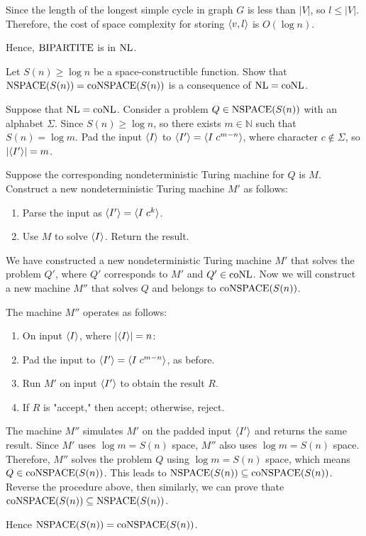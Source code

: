 \documentclass{homework}
\begin{document}
\begin{solution}
  Since the length of the longest simple cycle in graph $G$ is less than $|V|$,
  so $l \le |V|$.
  Therefore, the cost of space complexity for storing $\langle v, l\rangle$ is $O(\log n)$.

  Hence, $\mathrm{BIPARTITE}$ is in $\textup{NL}$.

\end{solution}

\begin{problem}
  Let $S(n) \ge \log n$ be a space-constructible function.
  Show that $\textup{NSPACE}(S(n)) = \textup{coNSPACE}(S(n))$ is a consequence of
  $\textup{NL} = \textup{coNL}$.
\end{problem}

\begin{solution}

  Suppose that $\textup{NL} = \textup{coNL}$. Consider a problem $Q \in \textup{NSPACE}(S(n))$
  with an alphabet $\Sigma$.
  Since $S(n) \ge \log n$, so there exists $m \in \mathbb{N}$
  such that $S(n) = \log m$.
  Pad the input $\langle I\rangle$ to $\langle I'\rangle = \langle I\;c^{m - n}\rangle$,
  where character $c \notin \Sigma$, so $|\langle I'\rangle| = m$.

  Suppose the corresponding nondeterministic Turing machine for $Q$ is $M$.
  Construct a new nondeterministic Turing machine $M'$ as follows:

  \begin{enumerate}
    \item Parse the input as $\langle I'\rangle = \langle I\;c^k\rangle$.
    \item Use $M$ to solve $\langle I\rangle$. Return the result.
  \end{enumerate}

  We have constructed a new nondeterministic Turing machine $M'$ that
  solves the problem $Q'$, where $Q'$ corresponds to $M'$ and $Q' \in \textup{coNL}$.
  Now we will construct a new machine $M''$ that
  solves $Q$ and belongs to $\textup{coNSPACE}(S(n))$.

  The machine $M''$ operates as follows:

  \begin{enumerate}
    \item On input $\langle I\rangle$, where $|\langle I\rangle| = n$:
    \item Pad the input to $\langle I'\rangle = \langle I\;c^{m-n}\rangle$, as before.
    \item Run $M'$ on input $\langle I'\rangle$ to obtain the result $R$.
    \item If $R$ is "accept," then accept; otherwise, reject.
  \end{enumerate}

  The machine $M''$ simulates $M'$ on the padded input $\langle I'\rangle$
  and returns the same result. Since $M'$ uses $\log m = S(n)$ space,
  $M''$ also uses $\log m = S(n)$ space.
  Therefore, $M''$ solves the problem $Q$ using $\log m = S(n)$ space,
  which means $Q \in \textup{coNSPACE}(S(n))$. This leads to
  $\textup{NSPACE}(S(n)) \subseteq \textup{coNSPACE}(S(n))$. Reverse the
  procedure above, then similarly, we can prove thate
  $\textup{coNSPACE}(S(n)) \subseteq \textup{NSPACE}(S(n))$.

  Hence $\textup{NSPACE}(S(n)) = \textup{coNSPACE}(S(n))$.

\end{solution}
\end{document}
